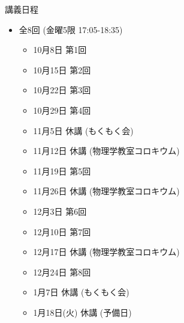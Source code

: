 \begin{frame}[t]{講義日程}
  \begin{itemize}
  \item 全8回 (金曜5限 {\color{red}17:05}-18:35)
    \begin{itemize}
    \item 10月8日 第1回
    \item 10月15日 第2回
    \item 10月22日 第3回
    \item 10月29日 第4回
    \item 11月5日 休講 (もくもく会)
    \item 11月12日 休講 (物理学教室コロキウム)
    \item 11月19日 第5回
    \item 11月26日 休講 (物理学教室コロキウム)
    \item 12月3日 第6回
    \item 12月10日 第7回
    \item 12月17日 休講 (物理学教室コロキウム)
    \item 12月24日 第8回
    \item 1月7日 休講 (もくもく会)
    \item 1月18日(火) 休講 (予備日)
    \end{itemize}
  \end{itemize}
\end{frame}

